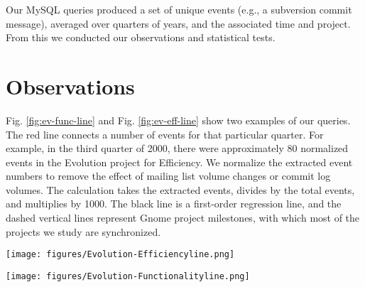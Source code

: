 \documentclass[conference, compsoc]{IEEEtran}
\begin{document}
Our MySQL queries produced a set of unique events (e.g., a subversion commit message), averaged over quarters of years, and the associated time and project. From this we conducted our observations and statistical tests.


\section{Observations}
\label{sec:observations}
Fig. \ref{fig:ev-func-line} and Fig. \ref{fig:ev-eff-line} show two examples of our queries. The red line connects a number of events for that particular quarter. For example, in the third quarter of 2000, there were approximately 80 normalized events in the Evolution project for Efficiency. We normalize the extracted event numbers to remove the effect of mailing list volume changes or commit log volumes. The calculation takes the extracted events, divides by the total events, and multiplies by 1000. The black line is a first-order regression line, and the dashed vertical lines represent Gnome project milestones, with which most of the projects we study are synchronized.
 
\begin{figure*}[ht]
\begin{minipage}[b]{0.5\textwidth}
\centering
\texttt{[image: figures/Evolution-Efficiencyline.png]} %
\label{fig:ev-eff-line}
\caption{Evolution product, Efficiency quality. Trend is negative, with some clear spikes after major releases.}
\end{minipage}
\hspace{0.5cm}
\begin{minipage}[b]{0.5\textwidth}
\centering
\texttt{[image: figures/Evolution-Functionalityline.png]}
\label{fig:ev-func-line}
\caption{Evolution product, Functionality quality. Trend is positive, with some clear spikes before major releases.}
\end{minipage}
\end{figure*}
\end{document}
